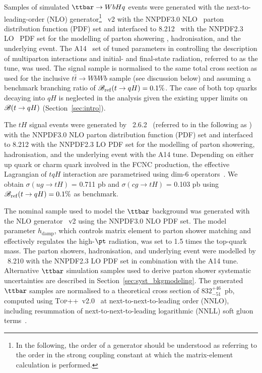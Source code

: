 \documentclass[PAPER, coverpage, atlasdraft=true, texlive=2016, UKenglish]{\ATLASLATEXPATH atlasdoc}
\providecommand{\DIFadd}[1]{{\protect\color{blue}\uwave{#1}}} %
\providecommand{\DIFaddbegin}{} %
\providecommand{\DIFaddend}{} %
\begin{document}
Samples of simulated $\ttbar \to WbHq$ \DIFaddbegin \DIFadd{($tt(qH)$) }\DIFaddend events were generated with the next-to-leading-order (NLO) generator\footnote{In the following, 
the order of a generator should be understood as referring to the order in the strong coupling constant at which the matrix-element \DIFaddbegin \DIFadd{(ME) }\DIFaddend calculation 
is performed.} {\powheg}~v2 \cite{Frixione:2007nw,Nason:2004rx,Frixione:2007vw,Alioli:2010xd}
with the NNPDF3.0 NLO~\cite{Ball:2014uwa} parton distribution function (PDF) set and interfaced to {\pythia} 8.212~\cite{Sjostrand:2007gs} with the NNPDF2.3 LO~\cite{Ball:2012cx} PDF set for the modelling of parton showering \DIFaddbegin \DIFadd{(PS)}\DIFaddend , hadronisation, and the underlying event. 
The A14~\cite{ATLASUETune4} set of tuned parameters in {\pythia} controlling the description of multiparton interactions and  
initial- and final-state radiation, referred to as the tune, was used.
The signal sample is normalised to the same total cross section as used for the inclusive $t\bar{t}\to WbWb$ sample (see discussion below) and
assuming a benchmark branching ratio of $\mathscr{B}_{\mathrm{ref}}(t\to qH)=0.1\%$.
The case of both top quarks decaying into $qH$ is neglected in the analysis given the existing upper limits on $\mathscr{B}(t \to qH)$ (Section~\ref{sec:intro}).

The $tH$ signal events were generated by {\amcatnlolong}~2.6.2~\cite{Alwall:2014hca}  (referred to in the following as {\amcatnlo})
with the NNPDF3.0 NLO parton distribution function (PDF) set and interfaced to {\pythia} 8.212 with the NNPDF2.3 LO PDF set for the modelling of parton showering,
hadronisation, and the underlying event with the A14 tune.
Depending on either up quark or charm quark involved in the FCNC production, the effective Lagrangian of $tqH$ interaction are parametrised using
dim-6 operators~\cite{fcnc_production_theory}. We obtain $\sigma(ug\to tH)$ = 0.711 pb and $\sigma(cg\to tH)$ = 0.103 pb using $\mathscr{B}_{\mathrm{ref}}(t\to qH)=0.1\%$ as benchmark.   

The nominal sample used to model the $\ttbar$ background was generated with the NLO generator {\powheg}~v2
using the NNPDF3.0 NLO PDF set. The {\powheg} model parameter $h_{\textrm{damp}}$, which controls 
matrix element to parton shower matching and effectively regulates the high-$\pt$ radiation, was set to 1.5 times the top-quark mass. 
The parton showers, hadronisation, and underlying event were modelled by {\pythia}~8.210 with the NNPDF2.3 LO PDF set in combination with the A14 tune.
Alternative $\ttbar$ simulation samples used to derive parton shower systematic uncertainties are described in Section~\ref{sec:syst_bkgmodeling}. 
The generated $\ttbar$ samples are normalised to a theoretical cross section of $832^{+46}_{-51}$~pb, 
computed using \textsc{Top++}~v2.0~\cite{Czakon:2011xx} at next-to-next-to-leading order (NNLO), 
including resummation of next-to-next-to-leading logarithmic (NNLL) soft gluon 
terms~\cite{Cacciari:2011hy,Baernreuther:2012ws,Czakon:2012zr,Czakon:2012pz,Czakon:2013goa}.
\end{document}
